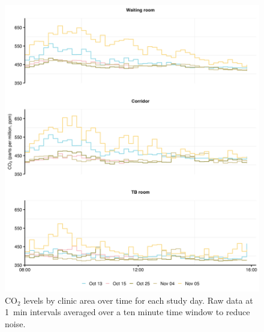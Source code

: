 \documentclass[fleqn,11pt]{wlscirep_supp}
\begin{document}
\begin{figure}[!htpb]
    \centering
    \includegraphics{results/data/co2-levels-over-time.png}
    \caption{CO$_2$ levels by clinic area over time for each study day. Raw data at 1~min intervals averaged over a ten minute time window to reduce noise.}
    \label{fig:co2-levels}
\end{figure}
\end{document}
